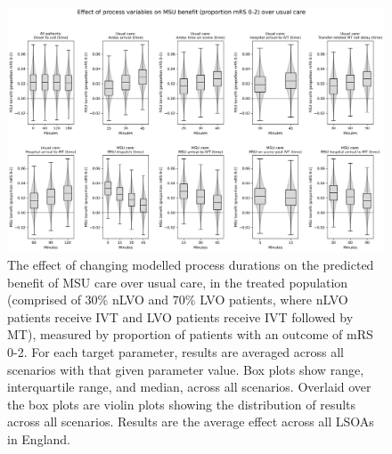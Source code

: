 \begin{figure}[h!]
    \centering
    \includegraphics[width=1\linewidth]{images/msu_net_mrs_0-2_benefit.png}
    \caption{The effect of changing modelled process durations on the predicted benefit of MSU care over usual care, in the treated population (comprised of 30\% nLVO and 70\% LVO patients, where nLVO patients receive IVT and LVO patients receive IVT followed by MT), measured by proportion of patients with an outcome of mRS 0-2. For each target parameter, results are averaged across all scenarios with that given parameter value. Box plots show range, interquartile range, and median, across all scenarios. Overlaid over the box plots are violin plots showing the distribution of results across all scenarios. Results are the average effect across all LSOAs in England.}
    \label{fig:scenarios_mrs}
\end{figure}


